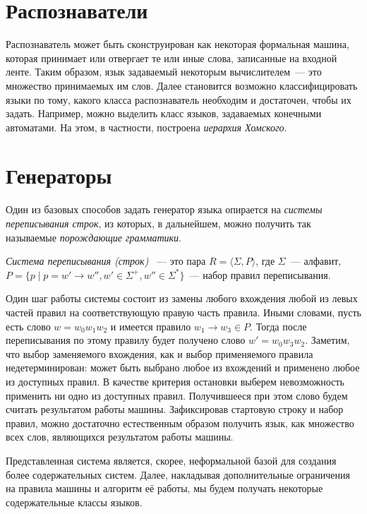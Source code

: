 \section{Распознаватели}

Распознаватель может быть сконструирован как некоторая формальная машина, которая принимает или отвергает те или иные слова, записанные на входной ленте.
Таким образом, язык задаваемый некоторым вычислителем~--- это множество принимаемых им слов.
Далее становится возможно классифицировать языки по тому, какого класса распознаватель необходим и достаточен, чтобы их задать.
Например, можно выделить класс языков, задаваемых конечными автоматами.
На этом, в частности, построена \emph{иерархия Хомского}.

\section{Генераторы}

Один из базовых способов задать генератор языка опирается на \emph{системы переписывания строк}, из которых, в дальнейшем, можно получить так называемые \emph{порождающие грамматики}.

\begin{definition}
    \emph{Система переписывания (строк)}%
    ~---
    это пара $R = \langle \Sigma, P  \rangle$, где $\Sigma$~--- алфавит, $P= \{p \mid p = w' \to w'', w' \in \Sigma^+, w'' \in \Sigma^*\}$~--- набор правил переписывания.
\end{definition}

Один шаг работы системы состоит из замены любого вхождения любой из левых частей правил на соответствующую правую часть правила.
Иными словами, пусть есть слово $w = w_0 w_1 w_2$ и имеется правило $w_1 \to w_3 \in P$.
Тогда после переписывания по этому правилу будет получено слово $w' = w_0 w_3 w_2$.
Заметим, что выбор заменяемого вхождения, как и выбор применяемого правила недетерминирован: может быть выбрано любое из вхождений и применено любое из доступных правил.
В качестве критерия остановки выберем невозможность применить ни одно из доступных правил.
Получившееся при этом слово будем считать результатом работы машины.
Зафиксировав стартовую строку и набор правил, можно достаточно естественным образом получить язык, как множество всех слов, являющихся результатом работы машины.

Представленная система является, скорее, неформальной базой для создания более содержательных систем.
Далее, накладывая дополнительные ограничения на правила машины и алгоритм её работы, мы будем получать некоторые содержательные классы языков.

